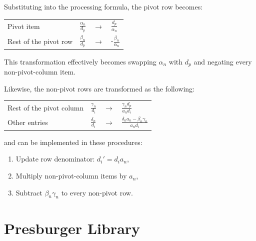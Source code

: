 \documentclass[logo,bsc,singlespacing,parskip]{infthesis}
\newenvironment{compactlist}
{ \begin{enumerate}
    \setlength{\itemsep}{0pt}
    \setlength{\parskip}{0pt}
    \setlength{\parsep}{0pt}     
}
{ \end{enumerate} }
\begin{document}
Substituting into the processing formula, the pivot row becomes:
\vspace*{-4mm}
\begin{table}[H]
\begin{center}
\begin{tabular}{llll}
Pivot item           & $\frac{\alpha_n}{d_p}$ & $\rightarrow$ & $\frac{d_p}{\alpha_n}$       \\
Rest of the pivot row    & $\frac{\beta_n}{d_p}$  & $\rightarrow$ & -$\frac{\beta_n}{\alpha_n}$  
\end{tabular}
\end{center}
\end{table}
\vspace*{-8mm}
This transformation effectively becomes swapping $\alpha_n$ with $d_p$ and
negating every non-pivot-column item. 

Likewise, the non-pivot rows are transformed as the following:
\vspace*{-4mm}
\begin{table}[H]
\begin{center}
\begin{tabular}{llll}
Rest of the pivot column& $\frac{\gamma_n}{d_i}$ & $\rightarrow$ & $\frac{\gamma_nd_p}{a_nd_i}$            \\
Other entries         & $\frac{\delta_n}{d_i}$    & $\rightarrow$ & $\frac{\delta_na_n-\beta_n\gamma_n}{a_nd_i}$  
\end{tabular}
\end{center}
\end{table}
\vspace*{-8mm}
and can be implemented in these procedures: 
\vspace*{-2.0mm}
\begin{compactlist}
    \item Update row denominator: $d_i' = d_ia_n$, 
    \item Multiply non-pivot-column items by $a_n$,
    \item Subtract $\beta_n\gamma_n$ to every non-pivot row.
\end{compactlist}

\section{Presburger Library}
\label{sec:presburger}
\end{document}
